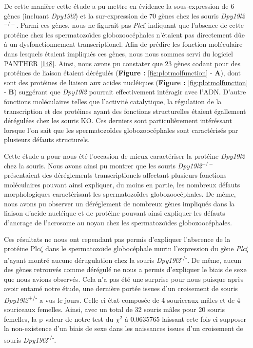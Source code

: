 \documentclass[12pt,twoside]{reedthesis}
\theoremstyle{definition}
\theoremstyle{definition}
\theoremstyle{remark}
\begin{document}
  De cette manière cette étude a pu mettre en évidence la sous-expression
  de 6 gènes (incluant \emph{Dpy19l2}) et la sur-expression de 70 gènes
  chez les souris \emph{Dpy19l2}\(^{-/-}\). Parmi ces gènes, nous ne
  figurait pas \emph{Plc}\(\zeta\) indiquant que l'absence de cette
  protéine chez les spermatozoïdes globozoocéphales n'étaient pas
  directement dûe à un dysfonctionnement transcriptionel. Afin de prédire
  les fonction moléculaire dans lesquels étaient impliqués ces gènes, nous
  nous sommes servi du logiciel PANTHER
  {[}\protect\hyperlink{ref-Mi2017}{148}{]}. Ainsi, nous avons pu
  constater que 23 gènes codant pour des protéines de liaison étaient
  dérégulés (\textbf{Figure : }\ref{fig:plotmolfunction} - \textbf{A}),
  dont sont des protéines de liaison aux acides nucléiques (\textbf{Figure
  : }\ref{fig:plotmolfunction} - \textbf{B}) suggérant que \emph{Dpy19l2}
  pourrait effectivement intéragir avec l'ADN. D'autre fonctions
  moléculaires telles que l'activité catalytique, la régulation de la
  transcription et des protéines ayant des fonctions structurelles étaient
  égallement dérégulées chez les souris KO. Ces derniers sont
  particulièrement intéréssant lorsque l'on sait que les spermatozoïdes
  globozoocéphales sont caractérisés par plusieurs défauts structurels.
  
  Cette étude a pour nous été l'occasion de mieux caractériser la protéine
  \emph{Dpy19l2} chez la souris. Nous avons ainsi pu montrer que les
  souris \emph{Dpy19l2}\(^{-/-}\) présentaient des déréglements
  transcriptionels affectant plusieurs fonctions moléculaires pouvant
  ainsi expliquer, du moins en partie, les nombreux défauts morphologiques
  caractérisant les spermatozoïdes globozoocéphales. De même, nous avons
  pu observer un déréglement de nombreux gènes impliqués dans la liaison
  d'acide nucléique et de protéine pouvant ainsi expliquer les défauts
  d'ancrage de l'acrosome au noyau chez les spermatozoïdes
  globozoocéphales.
  
  Ces résultats ne nous ont cependant pas permis d'expliquer l'abscence de
  la protéine Plc\(\zeta\) dans le spermatozoïde globocéphale murin
  l'expression du gène \emph{Plc}\(\zeta\) n'ayant montré aucune
  dérugulation chez la souris \emph{Dpy19l2}\textsuperscript{-/-}. De
  même, aucun des gènes retrouvés comme dérégulé ne nous a permis
  d'expliquer le biais de sexe que nous avions observés. Cela n'a pas été
  une surprise pour nous puisque après avoir entamé notre étude, une
  dernière portée issues d'un croisement de souris
  \emph{Dpy19l2}\textsuperscript{+/-} a vus le jours. Celle-ci état
  composée de 4 souriceaux mâles et de 4 souriceaux femelles. Ainsi, avec
  un total de 32 souris mâles pour 20 souris femelles, la p-valeur de
  notre test du \(\chi^2\) à 0.0635765 laissant cete fois-ci supposer la
  non-existence d'un biais de sexe dans les naissances issues d'un
  croisement de souris \emph{Dpy19l2}\textsuperscript{-/-}.
  
\end{document}
